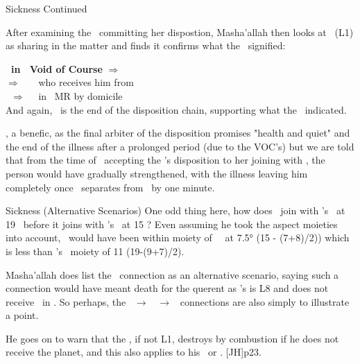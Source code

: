 \begin{frame}[t]{Sickness Continued}

After examining the \Moon\ committing her dispostion, Masha'allah then looks at \Mercury\ (L1) as sharing in the matter and finds it confirms what the \Moon\ signified:

\textbf{\Mercury\ in \Aries\ Void of Course} $\Rightarrow$ \Taurus \\
$\Rightarrow$ \Sextile\ \Venus\ \Pisces\ who receives him from \Taurus \\
\Venus\ $\Rightarrow$ \Trine\ \Jupiter\ in \Taurus\, MR by domicile \\
And again, \Jupiter\ is the end of the disposition chain, supporting what the \Moon\ indicated.
\vspace{0.2cm}

\Jupiter, a benefic, as the final arbiter of the disposition promises "health and quiet" and the end of the illness after a prolonged period (due to the VOC's) but we are told that from the time of \Venus\ accepting the \Moon's disposition to her joining with \Jupiter, the person would have gradually strengthened, with the illness leaving him completely once \Venus\ separates from \Jupiter\ by one minute.

\end{frame}
\begin{frame}[t]{Sickness (Alternative Scenarios)}
One odd thing here, how does \Venus\ join with \Jupiter's \Sextile\ at 19 \Pisces\ before it joins with \Mars's \Square\ at 15 \Pisces? Even assuming he took the aspect moieties into account, \Venus\ would have been within moiety of \Mars\ \Square\ at 7.5° \Pisces (15 - (7+8)/2)) which is less than \Jupiter's \Sextile\ moiety of 11 \Pisces (19-(9+7)/2). 

\vspace{0.3cm}
Masha'allah does list the \Mars\ connection as an alternative scenario, saying such a connection would have meant death for the querent as \Mars's is L8 and does not receive \Venus\ in \Pisces. So perhaps, the \Moon\ $\rightarrow$ \Venus\ $\rightarrow$ \Jupiter\ connections are also simply to illustrate a point.

He goes on to warn that the \Sun, if not L1, destroys by combustion if he does not receive the planet, and this also applies to his \Square\ or \Opposition. [JH]p23.\footnotemark[1]

\end{frame}